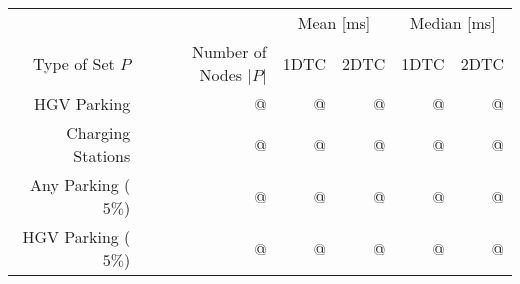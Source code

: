 \begin{tabular}{rrrrrr}
	\toprule
	                    &                       & \multicolumn{2}{c}{Mean [\si{\milli\second}]} & \multicolumn{2}{c}{Median [\si{\milli\second}]}               \\
	Type of Set $P$     & Number of Nodes $|P|$ & 1DTC                                          & 2DTC                                            & 1DTC & 2DTC \\
	\midrule
	HGV Parking         & @                     & @                                             & @                                               & @    & @    \\
	Charging Stations   & @                     & @                                             & @                                               & @    & @    \\
	Any Parking ($5\%$) & @                     & @                                             & @                                               & @    & @    \\
	HGV Parking ($5\%$) & @                     & @                                             & @                                               & @    & @    \\
	\bottomrule
\end{tabular}